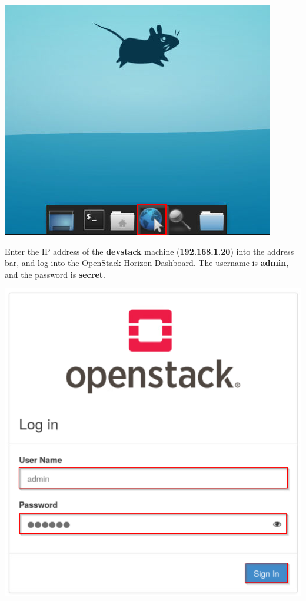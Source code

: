\documentclass[letterpaper, 12pt]{article}
\begin{document}
\begin{enumerate}
\begin{labstep}
        \begin{center}
            \includegraphics[scale=0.8]{images/part1/step3.png}
        \end{center}
    \end{labstep}

    \begin{labstep}
        Enter the IP address of the \textbf{devstack} machine (\textbf{192.168.1.20}) into the address bar, and log into the OpenStack Horizon Dashboard.
        The username is \textbf{admin}, and the password is \textbf{secret}.

        \begin{center}
            \includegraphics[scale=0.5]{images/part1/step4.png}
        \end{center}
    \end{labstep}


\end{enumerate}
\end{document}
